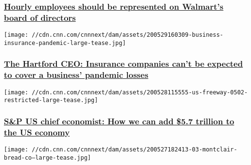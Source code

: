 \hypertarget{hourly-employees-should-be-represented-on-walmarts-board-of-directors}{%
\subsubsection{\texorpdfstring{\href{/2020/06/02/perspectives/walmart-hourly-board/index.html}{Hourly
employees should be represented on Walmart's board of
directors}}{Hourly employees should be represented on Walmart's board of directors}}\label{hourly-employees-should-be-represented-on-walmarts-board-of-directors}}

\href{/2020/06/01/perspectives/the-hartford-ceo-insurance-coronavirus/index.html}{}

\texttt{[image: //cdn.cnn.com/cnnnext/dam/assets/200529160309-business-insurance-pandemic-large-tease.jpg]}

\hypertarget{the-hartford-ceo-insurance-companies-cant-be-expected-to-cover-a-business-pandemic-losses}{%
\subsubsection{\texorpdfstring{\href{/2020/06/01/perspectives/the-hartford-ceo-insurance-coronavirus/index.html}{The
Hartford CEO: Insurance companies can't be expected to cover a business'
pandemic
losses}}{The Hartford CEO: Insurance companies can't be expected to cover a business' pandemic losses}}\label{the-hartford-ceo-insurance-companies-cant-be-expected-to-cover-a-business-pandemic-losses}}

\href{/2020/05/29/perspectives/us-economy-infrastructure-sp/index.html}{}

\texttt{[image: //cdn.cnn.com/cnnnext/dam/assets/200528115555-us-freeway-0502-restricted-large-tease.jpg]}

\hypertarget{sp-us-chief-economist-how-we-can-add-57-trillion-to-the-us-economy}{%
\subsubsection{\texorpdfstring{\href{/2020/05/29/perspectives/us-economy-infrastructure-sp/index.html}{S\&P
US chief economist: How we can add \$5.7 trillion to the US
economy}}{S\&P US chief economist: How we can add \$5.7 trillion to the US economy}}\label{sp-us-chief-economist-how-we-can-add-57-trillion-to-the-us-economy}}

\href{/2020/05/29/perspectives/bakery-coronavirus-success/index.html}{}

\texttt{[image: //cdn.cnn.com/cnnnext/dam/assets/200527182413-03-montclair-bread-co--large-tease.jpg]}

